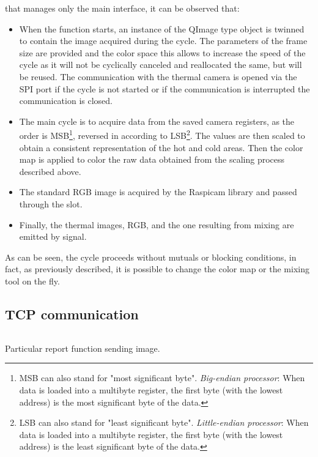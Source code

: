 that manages only the main interface, it can be observed that:
\begin{itemize}
\item When the function starts, an instance of the QImage type object is
twinned to contain the image acquired during the cycle. The parameters of the
frame size are provided and the color space this allows to increase the speed of
the cycle as it will not be cyclically canceled and reallocated the same, but
will be reused. The communication with the thermal camera is opened via the SPI
port if the cycle is not started or if the communication is interrupted the
communication is closed.
\item The main cycle is to acquire data from the saved camera registers, as the
order is MSB\footnote{MSB can also stand for "most significant byte".
\emph{Big-endian processor}: When data is loaded into a multibyte register, the
first byte (with the lowest address) is the most significant byte of the
data.\cite{56322}}, reversed in according to LSB\footnote{LSB can also stand
for "least significant byte". \emph{Little-endian processor}: When data is
loaded into a multibyte register, the first byte (with the lowest address) is
the least significant byte of the data.\cite{56322}}. The values are then scaled
to obtain a consistent representation of the hot and cold areas. Then the color
map is applied to color the raw data obtained from the scaling process described
above.
\item The standard RGB image is acquired by the Raspicam library and passed
through the slot.
\item Finally, the thermal images, RGB, and the one resulting from mixing are
emitted by signal.
\end{itemize}
%
As can be seen, the cycle proceeds without mutuals or blocking conditions, in
fact, as previously described, it is possible to change the color map or the
mixing tool on the fly.
%
\subsection{TCP communication}
\label{ssec:software-TCPSocket}

\begin{listing}[ht] 
\inputminted[bgcolor=bg,frame=lines,framesep=2mm, linenos=true, autogobble, breaklines=true, fontsize=\scriptsize]{c++}{software/code/mainwindow.cpp} 
\caption{Particular report function sending image.} 
\label{lst:mainwindow} 
\end{listing}
%
%

